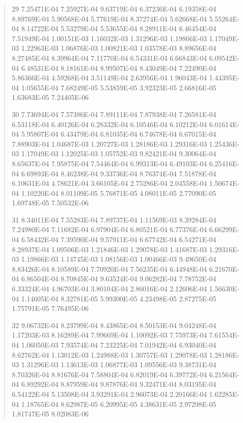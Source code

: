 \documentclass[letterpaper,10pt,english]{sphinxmanual}
\begin{document}
\begin{quote}
\begin{DUlineblock}{0em}
\item[] 29   7.25471E-04  7.25927E-04  9.63719E-04  6.37236E-04  6.19358E-04  8.89769E-04  5.90568E-04  5.77619E-04  8.37274E-04  5.62668E-04  5.55264E-04  8.14722E-04  5.53279E-04  5.53655E-04  8.28911E-04  6.46454E-04  7.51949E-04  1.00151E-03  1.16032E-03  1.31296E-03  1.19866E-03  1.17049E-03  1.22963E-03  1.06876E-03  1.00821E-03  1.03578E-03  8.89656E-04  8.27485E-04  8.39964E-04  7.11770E-04  6.54331E-04  6.66843E-04  6.09542E-04  6.48531E-04  8.18161E-04  8.99507E-04  8.43049E-04  7.22490E-04  5.86366E-04  4.59268E-04  3.51149E-04  2.63956E-04  1.96043E-04  1.44395E-04  1.05655E-04  7.68249E-05  5.53859E-05  3.92323E-05  2.66816E-05  1.63683E-05  7.24405E-06
\item[] 30   7.73694E-04  7.57386E-04  7.89111E-04  7.87938E-04  7.26581E-04  6.53118E-04  6.40126E-04  6.28332E-04  6.10546E-04  6.10212E-04  6.01614E-04  5.95807E-04  6.43479E-04  6.81035E-04  6.74678E-04  6.67015E-04  7.88903E-04  1.04687E-03  1.20727E-03  1.28186E-03  1.29316E-03  1.25436E-03  1.17049E-03  1.12025E-03  1.05752E-03  9.82421E-04  9.30064E-04  8.65637E-04  7.95875E-04  7.54464E-04  6.99313E-04  6.49103E-04  6.25416E-04  6.69893E-04  8.46238E-04  9.33736E-04  8.76374E-04  7.51878E-04  6.10631E-04  4.78621E-04  3.66105E-04  2.75286E-04  2.04558E-04  1.50674E-04  1.10220E-04  8.01109E-05  5.76871E-05  4.08011E-05  2.77090E-05  1.69748E-05  7.50532E-06
\item[] 31   8.34011E-04  7.55283E-04  7.89737E-04  1.11569E-03  8.39284E-04  7.24980E-04  7.11682E-04  6.97904E-04  6.80521E-04  6.77376E-04  6.66299E-04  6.58432E-04  7.39590E-04  9.57911E-04  6.67742E-04  6.54271E-04  8.28937E-04  1.09506E-03  1.21846E-03  1.29078E-03  1.41687E-03  1.29316E-03  1.19866E-03  1.14745E-03  1.08156E-03  1.00466E-03  9.49650E-04  8.83426E-04  8.10589E-04  7.70920E-04  7.56235E-04  6.44948E-04  6.21670E-04  6.86504E-04  8.70845E-04  9.63524E-04  9.06282E-04  7.78752E-04  6.33324E-04  4.96703E-04  3.80104E-04  2.86016E-04  2.12606E-04  1.56630E-04  1.14605E-04  8.32781E-05  5.99300E-05  4.23498E-05  2.87275E-05  1.75791E-05  7.76495E-06
\item[] 32   9.06732E-04  8.23799E-04  8.43865E-04  8.50153E-04  9.04248E-04  1.17203E-03  8.16289E-04  7.99669E-04  1.10092E-03  7.75973E-04  7.61554E-04  1.06050E-03  7.93574E-04  7.23225E-04  7.01942E-04  6.93040E-04  8.62762E-04  1.13012E-03  1.24988E-03  1.30757E-03  1.29078E-03  1.28186E-03  1.31296E-03  1.13613E-03  1.06877E-03  1.09556E-03  9.38731E-04  8.70326E-04  8.81676E-04  7.58804E-04  6.82019E-04  6.39772E-04  6.21564E-04  6.89292E-04  8.87959E-04  9.87876E-04  9.32471E-04  8.03195E-04  6.54122E-04  5.13508E-04  3.93291E-04  2.96073E-04  2.20166E-04  1.62285E-04  1.18765E-04  8.62987E-05  6.20995E-05  4.38631E-05  2.97298E-05  1.81747E-05  8.02083E-06

\end{DUlineblock}
\end{quote}
\end{document}

